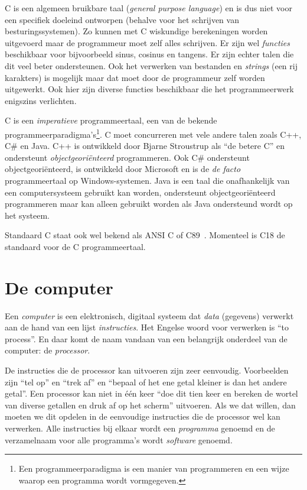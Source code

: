 C is een algemeen bruikbare taal (\textsl{general purpose language}) en is dus niet voor een specifiek doeleind ontworpen (behalve voor het schrijven van besturingssystemen). Zo kunnen met C wiskundige berekeningen worden uitgevoerd maar de programmeur moet zelf alles schrijven. Er zijn wel \textsl{functies} beschikbaar voor bijvoorbeeld sinus, cosinus en tangens. Er zijn echter talen die dit veel beter ondersteunen. Ook het verwerken van bestanden en \textsl{strings} (een rij karakters) is mogelijk maar dat moet door de programmeur zelf worden uitgewerkt. Ook hier zijn diverse functies beschikbaar die het programmeerwerk enigszins verlichten.

C is een \textsl{imperatieve} programmeertaal, een van de bekende programmeerparadigma's\footnote{Een programmeerparadigma is een manier van programmeren en een wijze waarop een programma wordt vormgegeven.}.
C moet concurreren met vele andere talen zoals C++, C\# en Java. C++ is ontwikkeld door Bjarne Stroustrup als ``de betere C'' en ondersteunt \textsl{objectgeoriënteerd} programmeren. Ook C\# ondersteunt objectgeoriënteerd, is ontwikkeld door Microsoft en is de \textsl{de facto} programmeertaal op Windows-systemen. Java is een taal die onafhankelijk van een computersysteem gebruikt kan worden, ondersteunt objectgeoriënteerd programmeren maar kan alleen gebruikt worden als Java ondersteund wordt op het systeem.

Standaard C staat ook wel bekend als ANSI C of C89~\cite{1989programming}. Momenteel is C18 de standaard voor de C programmeertaal.

\section{De computer}
Een \textsl{computer} is een elektronisch, digitaal systeem dat \textsl{data} (gegevens) verwerkt aan de hand van een lijst \textsl{instructies}. Het Engelse woord voor verwerken is ``to process''. En daar komt de naam vandaan van een belangrijk onderdeel van de computer: de \textsl{processor}. 

De instructies die de processor kan uitvoeren zijn zeer eenvoudig. Voorbeelden zijn ``tel op'' en ``trek af'' en ``bepaal of het ene getal kleiner is dan het andere getal''. Een processor kan niet in één keer ``doe dit tien keer en bereken de wortel van diverse getallen en druk af op het scherm'' uitvoeren. Als we dat willen, dan moeten we dit opdelen in de eenvoudige instructies die de processor wel kan verwerken. Alle instructies bij elkaar wordt een \textsl{programma} genoemd en de verzamelnaam voor alle programma's wordt \textsl{software} genoemd.


